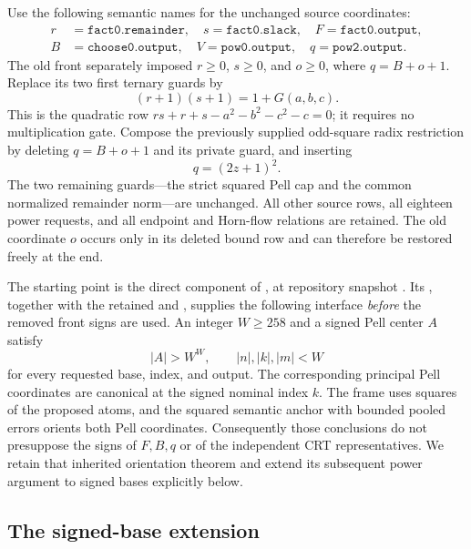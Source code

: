 Use the following semantic names for the unchanged source coordinates:
\[
\begin{split}
 r&=\texttt{fact0.remainder},\quad
 s=\texttt{fact0.slack},\quad F=\texttt{fact0.output},\\
 B&=\texttt{choose0.output},\quad
 V=\texttt{pow0.output},\quad q=\texttt{pow2.output}.
\end{split}
\]
The old front separately imposed $r\geq0$, $s\geq0$, and
$o\geq0$, where $q=B+o+1$.  Replace its two first ternary guards by
\begin{equation}
 (r+1)(s+1)=1+G(a,b,c).
 \label{eq:front-fused}
\end{equation}
This is the quadratic row $rs+r+s-a^2-b^2-c^2-c=0$; it requires no
multiplication gate.  Compose the previously supplied odd-square radix
restriction by deleting $q=B+o+1$ and its private guard, and inserting
\begin{equation}
 q=(2z+1)^2.
 \label{eq:front-odd}
\end{equation}
The two remaining guards---the strict squared Pell cap and the common
normalized remainder norm---are unchanged.  All other source rows,
all eighteen power requests, and all endpoint and Horn-flow relations
are retained.  The old coordinate $o$ occurs only in its deleted bound
row and can therefore be restored freely at the end.

The starting point is the direct component of
, at repository
snapshot .
Its , together with the retained
 and
, supplies the following interface
\emph{before} the removed front signs are used.  An integer $W\geq258$
and a signed Pell center $A$ satisfy
\begin{equation}
 |A|>W^W,\qquad |n|,|k|,|m|<W
 \label{eq:front-frame}
\end{equation}
for every requested base, index, and output.  The corresponding principal
Pell coordinates are canonical at the signed nominal index $k$.
The frame uses squares of the proposed atoms, and the squared semantic
anchor with bounded pooled errors orients both Pell coordinates.
Consequently those conclusions do not presuppose the signs of $F,B,q$
or of the independent CRT representatives.  We retain that inherited
orientation theorem and extend its subsequent power argument to signed
bases explicitly below.

\subsection{The signed-base extension}

